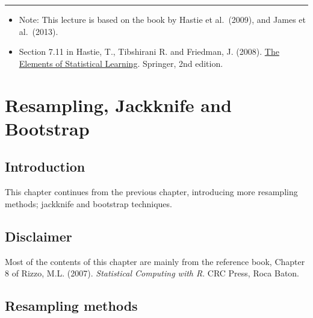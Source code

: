 \documentclass[
  letterpaper,
  DIV=11,
  numbers=noendperiod]{scrreprt}
\begin{document}
\begin{center}\rule{0.5\linewidth}{0.5pt}\end{center}

\begin{itemize}
\item
  Note: This lecture is based on the book by Hastie et al.~(2009), and
  James et al.~(2013).
\item
  Section 7.11 in Hastie, T., Tibshirani R. and Friedman, J. (2008).
  \href{https://www.sas.upenn.edu/~fdiebold/NoHesitations/BookAdvanced.pdf}{The
  Elements of Statistical Learning}. Springer, 2nd edition.
\end{itemize}


\chapter{Resampling, Jackknife and
Bootstrap}\label{resampling-jackknife-and-bootstrap}

\newcommand{\E}{\mathbb E}
\newcommand{\R}{\mathbb{R}}
\newcommand{\var}{\mathbb{V}ar}
\newcommand{\bx}{\mathbf{x}}
\newcommand{\bX}{\mathbf{X}}
\newcommand{\cov}{\mathbb{C}ov}
\newcommand{\mse}{\mathrm{MSE}}
\newcommand{\corr}{\mathbb{C}orr}
\newcommand{\unif}{\operatorname{Unif}}
\newcommand{\geom}{\operatorname{Geom}}
\newcommand{\bet}{\operatorname{Beta}}
\newcommand{\bern}{\operatorname{Bern}}
\newcommand{\iid}{\overset{iid}{\sim}}
\newcommand{\ef}{\operatorname{Eff}}
\newcommand{\htt}{\hat \theta}
\newcommand{\b}{\mathbb b}

\section{Introduction}\label{introduction-1}

This chapter continues from the previous chapter, introducing more
resampling methods; jackknife and bootstrap techniques.

\section{Disclaimer}\label{disclaimer}

Most of the contents of this chapter are mainly from the reference book,
Chapter 8 of Rizzo, M.L. (2007). \emph{Statistical Computing with R}.
CRC Press, Roca Baton.

\section{Resampling methods}\label{resampling-methods-1}
\end{document}
